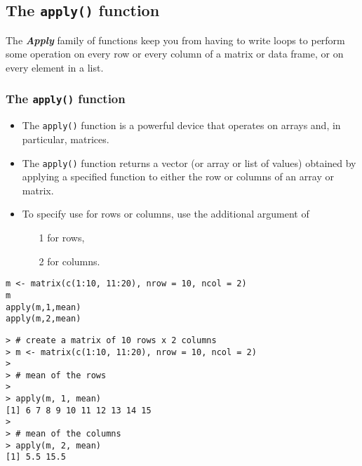 \documentclass[12pt]{article}
\begin{document}
\newpage
\subsection*{The \texttt{apply()} function}
The \textbf{\textit{Apply}} family of functions keep you from having to write loops to perform some operation on every row or every column of a matrix or data frame, or on every element in a list.
\subsubsection*{The \texttt{apply()} function}
\begin{itemize}
	\item  The \texttt{apply()} function is a powerful device that operates on arrays and, in particular, matrices.

\item The  \texttt{apply()} function returns a vector (or array or list of values) obtained by applying a specified function to either the row or columns of an array or matrix.
\item 
To specify use for rows or columns, use the additional argument of \begin{itemize}
\item[1] for rows, \item[2] for columns.
\end{itemize}
\end{itemize}
\begin{framed}
\begin{verbatim}
m <- matrix(c(1:10, 11:20), nrow = 10, ncol = 2)
m
apply(m,1,mean)
apply(m,2,mean)
\end{verbatim}
\end{framed}
\newpage
\begin{verbatim}
> # create a matrix of 10 rows x 2 columns
> m <- matrix(c(1:10, 11:20), nrow = 10, ncol = 2)
>
> # mean of the rows
>
> apply(m, 1, mean)
[1] 6 7 8 9 10 11 12 13 14 15
>
> # mean of the columns
> apply(m, 2, mean)
[1] 5.5 15.5
\end{verbatim}
\newpage
\end{document}
